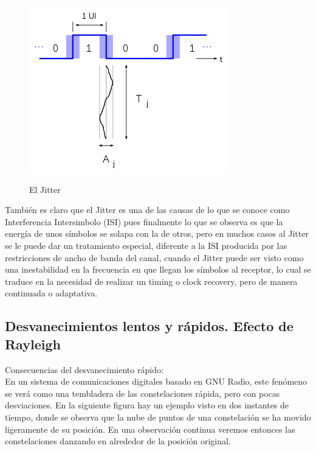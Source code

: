 \begin{figure}[h!]
	\captionsetup{justification = raggedright, singlelinecheck = false}
	\caption{El Jitter} 
	\centering
	\includegraphics[scale=1]{Imagenes/Intersimbolo.png}
	\label{fig:Intersimbolo}
\end{figure}

También es claro que el Jitter es una de las causas de lo que se conoce como Interferencia Intersimbolo (ISI) pues finalmente lo que se observa es que la energía de unos símbolos se solapa con la de otros, pero en muchos casos al Jitter se le puede dar un tratamiento especial, diferente a la ISI producida por las restricciones de ancho de banda del canal, cuando el Jitter puede ser visto como una inestabilidad en la frecuencia en que llegan los símbolos al receptor, lo cual se traduce en la necesidad de realizar un timing o clock recovery, pero de manera continuada o adaptativa. \\



\subsection{Desvanecimientos lentos y rápidos. Efecto de Rayleigh}
Consecuencias del desvanecimiento rápido: \\
En un sistema de comunicaciones digitales basado en GNU Radio, este fenómeno se verá como una tembladera de las constelaciones rápida, pero con pocas desviaciones. En la siguiente figura hay un ejemplo visto en dos instantes de tiempo, donde se observa que la nube de puntos de una constelación se ha movido ligeramente de su posición. En una observación continua veremos entonces las constelaciones danzando en alrededor de la posición original. \\



